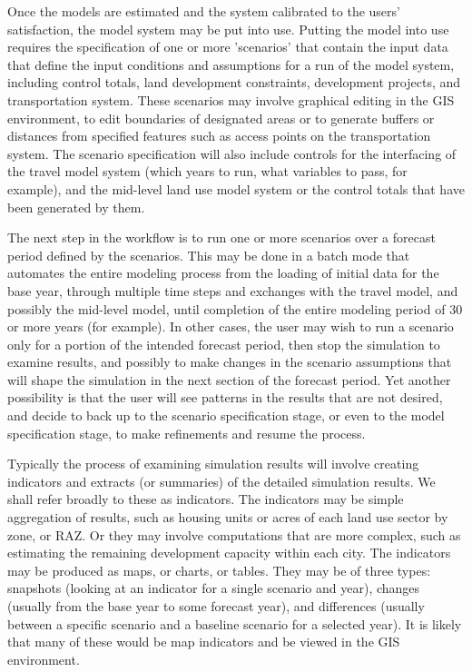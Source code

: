 Once the models are estimated and the system calibrated to the users' satisfaction, the model system may be put into use. Putting
the model into use requires the specification of one or more 'scenarios' that contain the input data that define the input conditions
and assumptions for a run of the model system, including control totals, land development constraints, development projects, and
transportation system.  These scenarios may involve graphical editing in the GIS environment, to edit boundaries of designated areas
or to generate buffers or distances from specified features such as access points on the transportation system.  The scenario
specification will also include controls for the interfacing of the travel model system (which years to run, what variables to pass,
for example), and the mid-level land use model system or the control totals that have been generated by them.

The next step in the workflow is to run one or more scenarios over a forecast period defined by the scenarios.  This may be done in
a batch mode that automates the entire modeling process from the loading of initial data for the base year, through multiple time
steps and exchanges with the travel model, and possibly the mid-level model, until completion of the entire modeling period of 30
or more years (for example).  In other cases, the user may wish to run a scenario only for a portion of the intended forecast period,
then stop the simulation to examine results, and possibly to make changes in the scenario assumptions that will shape the simulation
in the next section of the forecast period.  Yet another possibility is that the user will see patterns in the results that are not
desired, and decide to back up to the scenario specification stage, or even to the model specification stage, to make refinements
and resume the process.

Typically the process of examining simulation results will involve creating indicators and extracts (or summaries) of the detailed
simulation results.  We shall refer broadly to these as indicators.  The indicators may be simple aggregation of results, such as
housing units or acres of each land use sector by zone, or RAZ.  Or they may involve computations that are more complex, such as
estimating the remaining development capacity within each city.  The indicators may be produced as maps, or charts, or tables.
They may be of three types: snapshots (looking at an indicator for a single scenario and year), changes (usually from the base year
to some forecast year), and differences (usually between a specific scenario and a baseline scenario for a selected year).  It is
likely that many of these would be map indicators and be viewed in the GIS environment.


